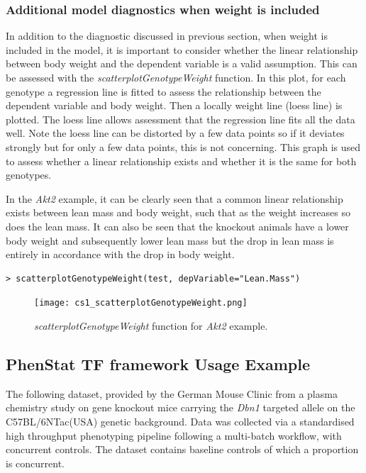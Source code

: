 \documentclass[12pt,a4paper]{article}
\begin{document}
\subsubsection{Additional model diagnostics when weight is included}
In addition to the diagnostic discussed in previous section, when weight is included in the model, it is important to consider whether the linear relationship between body weight and the dependent variable is a valid assumption. 
This can be assessed with the \textit{scatterplotGenotypeWeight} function. 
In this plot, for each genotype a regression line is fitted to assess the relationship between the dependent variable and body weight. 
Then a locally weight line (loess line) is plotted. 
The loess line allows assessment that the regression line fits all the data well.
Note the loess line can be distorted by a few data points so if it deviates strongly but for only a few data points, this is not concerning.  
This graph is used to assess whether a linear relationship exists and whether it is the same for both genotypes.  

In the \textit{Akt2} example, it can be clearly seen that a common linear relationship exists between lean mass and body weight, such that as the weight increases so does the lean mass. 
It can also be seen that the knockout animals have a lower body weight and subsequently lower lean mass but the drop in lean mass is entirely in accordance with the drop in body weight. 

\begingroup
\fontsize{8pt}{12pt}\selectfont
\begin{verbatim}
> scatterplotGenotypeWeight(test, depVariable="Lean.Mass")
\end{verbatim}
\endgroup 

\begin{figure}[H]%
\centerline{\texttt{[image: cs1\_scatterplotGenotypeWeight.png]}}
\caption{\textit{scatterplotGenotypeWeight} function for \textit{Akt2} example.}\label{fig:23}
\end{figure}

\subsection{PhenStat TF framework Usage Example}
\label{cs_tf}
The following dataset, provided by the German Mouse Clinic  from a plasma chemistry study on gene knockout mice carrying the \textit{Dbn1} targeted allele on the C57BL\//6NTac(USA) genetic background. Data was collected via a standardised high throughput phenotyping pipeline following a multi-batch workflow, with concurrent controls.  The dataset contains baseline controls of which a proportion is concurrent.
\end{document}
